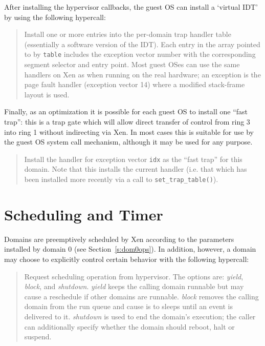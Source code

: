 \documentclass[11pt,twoside,final,openright]{report}
\begin{document}
After installing the hypervisor callbacks, the guest OS can 
install a `virtual IDT' by using the following hypercall: 

\begin{quote} 

Install one or more entries into the per-domain 
trap handler table (essentially a software version of the IDT). 
Each entry in the array pointed to by {\tt table} includes the 
exception vector number with the corresponding segment selector 
and entry point. Most guest OSes can use the same handlers on 
Xen as when running on the real hardware; an exception is the 
page fault handler (exception vector 14) where a modified 
stack-frame layout is used. 


\end{quote} 

Finally, as an optimization it is possible for each guest OS 
to install one ``fast trap'': this is a trap gate which will 
allow direct transfer of control from ring 3 into ring 1 without
indirecting via Xen. In most cases this is suitable for use by 
the guest OS system call mechanism, although it may be used for
any purpose. 


\begin{quote}

Install the handler for exception vector {\tt idx} as the ``fast
trap'' for this domain. Note that this installs the current handler 
(i.e. that which has been installed more recently via a call 
to {\tt set\_trap\_table()}). 

\end{quote}



\section{Scheduling and Timer}

Domains are preemptively scheduled by Xen according to the 
parameters installed by domain 0 (see Section~\ref{s:dom0ops}). 
In addition, however, a domain may choose to explicitly 
control certain behavior with the following hypercall: 

\begin{quote} 

Request scheduling operation from hypervisor. The options are: {\it
yield}, {\it block}, and {\it shutdown}.  {\it yield} keeps the
calling domain runnable but may cause a reschedule if other domains
are runnable.  {\it block} removes the calling domain from the run
queue and cause is to sleeps until an event is delivered to it.  {\it
shutdown} is used to end the domain's execution; the caller can
additionally specify whether the domain should reboot, halt or
suspend.
\end{quote} 
\end{document}

